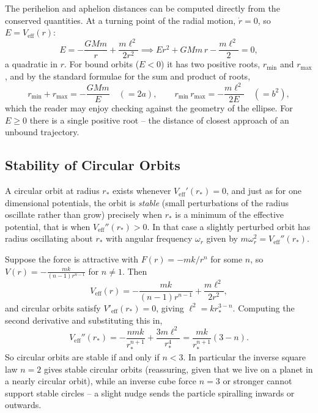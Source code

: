 \documentclass[a4paper]{scrartcl}
\begin{document}
\begin{example}
	The perihelion and aphelion distances can be computed directly from the conserved quantities. At a turning point of the radial motion, $\dot{r} = 0$, so $E = V_{\text{eff}}(r)$:
	$$
	E = -\frac{GMm}{r} + \frac{m\ell^2}{2r^2} \implies E r^2 + GMm\, r - \frac{m\ell^2}{2} = 0,
	$$
	a quadratic in $r$. For bound orbits ($E < 0$) it has two positive roots, $r_{\min}$ and $r_{\max}$, and by the standard formulae for the sum and product of roots,
	$$
	r_{\min} + r_{\max} = -\frac{GMm}{E} \quad (= 2a), \qquad r_{\min}\, r_{\max} = -\frac{m \ell^2}{2E} \quad (= b^2),
	$$
	which the reader may enjoy checking against the geometry of the ellipse. For $E \geq 0$ there is a single positive root -- the distance of closest approach of an unbound trajectory.
\end{example}

\subsection{Stability of Circular Orbits}

A circular orbit at radius $r_*$ exists whenever $V_{\text{eff}}'(r_*) = 0$, and just as for one dimensional potentials, the orbit is \emph{stable} (small perturbations of the radius oscillate rather than grow) precisely when $r_*$ is a minimum of the effective potential, that is when $V_{\text{eff}}''(r_*) > 0$. In that case a slightly perturbed orbit has radius oscillating about $r_*$ with angular frequency $\omega_r$ given by $m\omega_r^2 = V_{\text{eff}}''(r_*)$.

\begin{example}
	Suppose the force is attractive with $F(r) = -mk/r^n$ for some $n$, so $V(r) = -\frac{mk}{(n-1)r^{n - 1}}$ for $n \neq 1$. Then
	$$
	V_{\text{eff}}(r) = -\frac{mk}{(n - 1) r^{n-1}} + \frac{m \ell^2}{2 r^2},
	$$
	and circular orbits satisfy $V'_{\text{eff}}(r_*) = 0$, giving $\ell^2 = k r_*^{3 - n}$. Computing the second derivative and substituting this in,
	$$
	V_{\text{eff}}''(r_*) = -\frac{nmk}{r_*^{n +1}} + \frac{3m\ell^2}{r_*^4} = \frac{mk}{r_*^{n + 1}}\left(3 - n\right).
	$$
	So circular orbits are stable if and only if $n < 3$. In particular the inverse square law $n = 2$ gives stable circular orbits (reassuring, given that we live on a planet in a nearly circular orbit), while an inverse cube force $n = 3$ or stronger cannot support stable circles -- a slight nudge sends the particle spiralling inwards or outwards.
\end{example}
\end{document}
